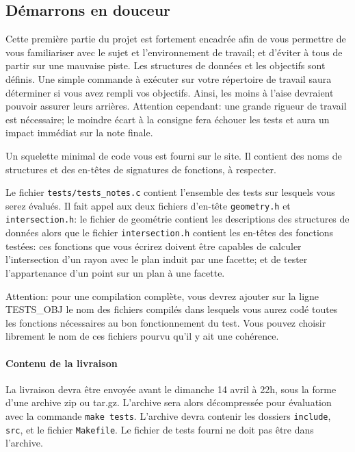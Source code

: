 \documentclass[10pt, a4paper ]{article}
\begin{document}
\subsection{Démarrons en douceur }
\label{sec:unit}

Cette première partie du projet est fortement encadrée afin de vous permettre de
vous familiariser avec le sujet et l'environnement de travail; et d'éviter à
tous de partir sur une mauvaise piste. Les structures de données et les
objectifs sont définis.  Une simple commande à exécuter sur votre répertoire de
travail saura déterminer si vous avez rempli vos objectifs. Ainsi, les moins à
l'aise devraient pouvoir assurer leurs arrières.  Attention cependant: une
grande rigueur de travail est nécessaire; le moindre écart à la consigne fera
échouer les tests et aura un impact immédiat sur la note finale.

Un squelette minimal de code vous est fourni sur le site. Il contient des noms
de structures et des en-têtes de signatures de fonctions, à respecter.

Le fichier \texttt{tests/tests\_notes.c} contient l'ensemble des tests sur
lesquels vous serez évalués. Il fait appel aux deux fichiers d'en-tête
\texttt{geometry.h} et \texttt{intersection.h}: le fichier de geométrie contient
les descriptions des structures de données alors que le fichier
\texttt{intersection.h} contient les en-têtes des fonctions testées: ces
fonctions que vous écrirez doivent être capables de calculer l'intersection d'un
rayon avec le plan induit par une facette; et de tester l'appartenance d'un
point sur un plan à une facette.

Attention: pour une compilation complète, vous devrez ajouter sur la ligne
\textsf{TESTS\_OBJ} le nom des fichiers compilés dans lesquels vous aurez codé
toutes les fonctions nécessaires au bon fonctionnement du test. Vous pouvez
choisir librement le nom de ces fichiers pourvu qu'il y ait une cohérence.

\paragraph{Contenu de la livraison} La livraison devra être envoyée avant le
dimanche 14 avril à 22h, sous la forme d'une archive zip ou tar.gz. L'archive
sera alors décompressée pour évaluation avec la commande \texttt{make tests}.
L'archive devra contenir les dossiers \texttt{include}, \texttt{src}, et le
fichier \texttt{Makefile}. Le fichier de tests fourni ne doit pas être dans
l'archive.
\end{document}
